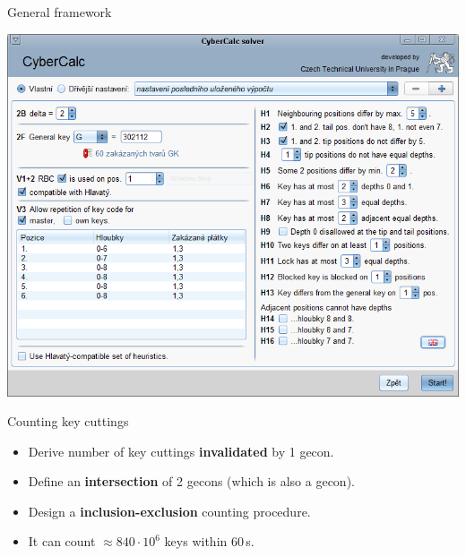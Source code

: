 \begin{frame}{General framework}
  \begin{minipage}[t][180pt][t]{.40\textwidth}
    \bigskip

    \includegraphics[width=\textwidth]{Constraints.png}
  \end{minipage}
  \begin{minipage}[t][180pt][t]{.55\textwidth}
    \begin{block}{Counting key cuttings}
      \begin{itemize}
        \item Derive number of key cuttings \textbf{invalidated} by 1 gecon.
        \item Define an \textbf{intersection} of 2 gecons (which is also a gecon).
        \item Design a \textbf{inclusion-exclusion} counting procedure.
        \item It can count $\approx 840 \cdot 10^6$ keys within $60\,$s.
      \end{itemize}
    \end{block}
  \end{minipage}
\end{frame}

